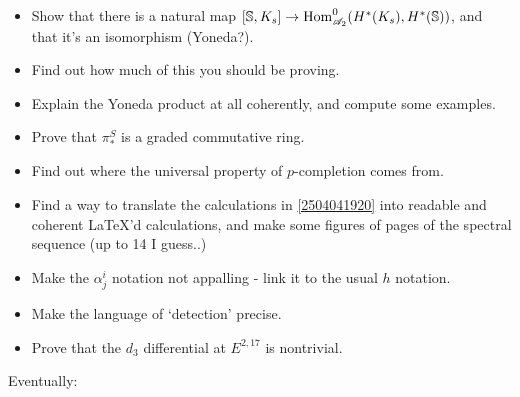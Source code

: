 \documentclass{MetricNotes2023}
\def\bb{\ensuremath\mathbb}
\def\A{\ensuremath{\mathscr{A}_2}}
\DeclareMathOperator{\Hom}{Hom}
\begin{document}
\begin{itemize}
\item Show that there is a natural map \([\bb{S}, K_s]\to \Hom^0_{\A}(H^*(K_s), H^*(\bb{S}))\), and that it's an isomorphism (Yoneda?). 

\item Find out how much of this you should be proving.

\item Explain the Yoneda product at all coherently, and compute some examples.

\item Prove that \(\pi_*^S\) is a graded commutative ring.

\item Find out where the universal property of \(p\)-completion comes from. 

\item Find a way to translate the calculations in \ref{2504041920} into readable and coherent LaTeX'd calculations, and make some figures of pages of the spectral sequence (up to 14 I guess..) 

\item Make the \(\alpha^i_j\) notation not appalling - link it to the usual \(h\) notation.

\item Make the language of `detection' precise. 

\item Prove that the \(d_3\) differential at \(E^{2,17}\) is nontrivial.
\end{itemize}

Eventually:
\end{document}
